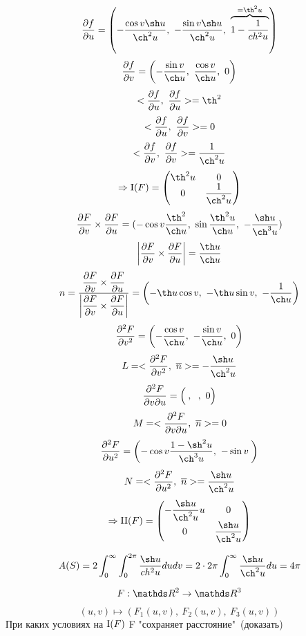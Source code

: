 \documentclass[12pt, fleqn]{article}
\begin{document}
\begin{Sol}
  \[\dfrac{\d f}{\d u} = \Br{-\dfrac{\cos v \sh u}{\ch^2 u},\ -\dfrac{\sin v \sh u}{\ch^2 u},\ \ob{= \th^2 u}{1 - \dfrac{1}{ch^2 u}}}\]
  \[\dfrac{\d f}{\d v} = \Br{-\dfrac{\sin v}{\ch u},\ \dfrac{\cos v}{\ch u},\ 0}\]
  \[<\dfrac{\d f}{\d u},\ \dfrac{\d f}{\d u}> = \th^2\]
  \[<\dfrac{\partial f}{\partial u},\ \dfrac{\partial f}{\partial v}> = 0\]
  \[<\dfrac{\d f}{\d v},\ \dfrac{\d f}{\d v}> = \dfrac{1}{\ch^2 u}\]
  \[\Ra \RNumb{1}(F) = \begin{pmatrix}
    {}\th^2 u & 0\\
    0 & \dfrac{1}{\ch^2 u}
  \end{pmatrix}\]
  \[\frac{\d F}{\d v} \times \frac{\d F}{\d u} =
  (
    -\cos v \dfrac{\th^2}{\ch u},\
    \sin \dfrac{\th^2 u}{\ch u},\
    -\dfrac{\sh u}{\ch^3 u}
  )\]
  \[\abs{\dfrac{\d F}{\d v} \times \dfrac{\d F}{\d u}} = \dfrac{\th u}{\ch u}\]
  \[n =
  \dfrac{
    \dfrac{\d F}{\d v} \times \dfrac{\d F}{\d u}
  }{
    \abs{\dfrac{\d F}{\d v} \times \dfrac{\d F}{\d u}}
  } = \Br{- \th u \cos v,\ -\th u \sin v,\ -\dfrac{1}{\ch u}}\]
  \[\frac{\d^2 F}{\d v^2} = \Br{-\dfrac{\cos v}{\ch u},\ -\dfrac{\sin v}{\ch u},\ 0}\]
  \[L = <\frac{\d^2 F}{\d v^2},\ \ol{n}> = -\dfrac{\sh u}{\ch^2 u}\]
  \[\frac{\partial^2 F}{\partial v \partial u} = \left(\dfrac{}{},\ \dfrac{}{},\ 0\right)\]
  \[M = <\frac{\partial^2 F}{\partial v \partial u},\ \overline{n}> = 0\]
  \[\frac{\d^2 F}{\d u^2} = \Br{-\cos v \dfrac{1-\sh^2 u}{\ch^3 u},\ -\sin v \dfrac{}{}}\]
  \[N = <\frac{\d^2 F}{\d u^2},\ \ol{n}> = \dfrac{\sh u}{\ch^2 u}\]
  \[\Ra \RNumb{2}(F) = \begin{pmatrix}
    -\dfrac{\sh u}{\ch^2 u} u & 0\\
    0 & \dfrac{\sh u}{\ch^2 u}
  \end{pmatrix}\]

  \begin{figure}[H]
      \centering
  \end{figure}

  \[A(S) = 2 \int_0^{\infty} \int_0^{2\pi} \dfrac{\sh u}{ch^2 u} du dv = 2 \cdot 2\pi \int_0^{\infty} \dfrac{\sh u}{\ch^2 u} du = 4\pi\]
\end{Sol}

\begin{Example}
  \[F: \R^2 \ra \R^3\]
  \[(u,v) \mapsto (F_1(u,v),\ F_2(u,v),\ F_3 (u,v))\]
  При каких условиях на $\RNumb{1}(F)$ F "сохраняет расстояние"\ (доказать)
\end{Example}
\end{document}

